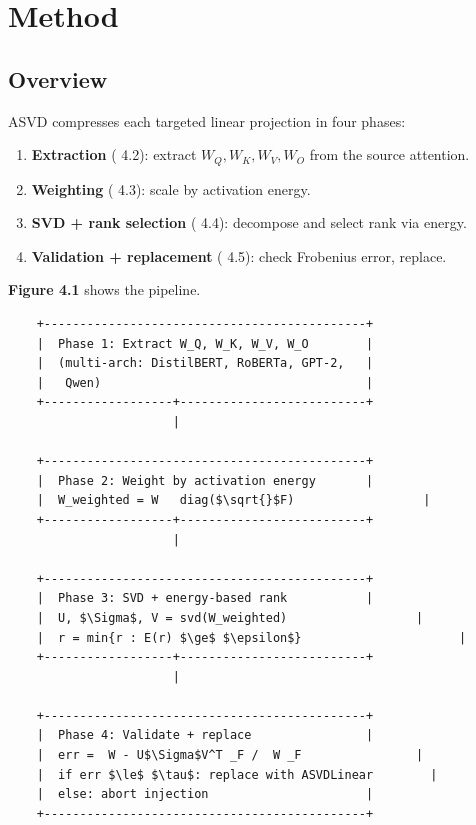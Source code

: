 
\section{Method}

\subsection{Overview}

ASVD compresses each targeted linear projection in four phases:

\begin{enumerate}
\item \textbf{Extraction} ( 4.2): extract $W_Q, W_K, W_V, W_O$ from the source
  attention.
\item \textbf{Weighting} ( 4.3): scale by activation energy.
\item \textbf{SVD + rank selection} ( 4.4): decompose and select rank via energy.
\item \textbf{Validation + replacement} ( 4.5): check Frobenius error, replace.

\end{enumerate}
\textbf{Figure 4.1} shows the pipeline.

\begin{lstlisting}
    +---------------------------------------------+
    |  Phase 1: Extract W_Q, W_K, W_V, W_O        |
    |  (multi-arch: DistilBERT, RoBERTa, GPT-2,   |
    |   Qwen)                                     |
    +------------------+--------------------------+
                       |
                        
    +---------------------------------------------+
    |  Phase 2: Weight by activation energy       |
    |  W_weighted = W   diag($\sqrt{}$F)                  |
    +------------------+--------------------------+
                       |
                        
    +---------------------------------------------+
    |  Phase 3: SVD + energy-based rank           |
    |  U, $\Sigma$, V = svd(W_weighted)                  |
    |  r = min{r : E(r) $\ge$ $\epsilon$}                      |
    +------------------+--------------------------+
                       |
                        
    +---------------------------------------------+
    |  Phase 4: Validate + replace                |
    |  err =  W - U$\Sigma$V^T _F /  W _F                |
    |  if err $\le$ $\tau$: replace with ASVDLinear        |
    |  else: abort injection                      |
    +---------------------------------------------+
\end{lstlisting}

